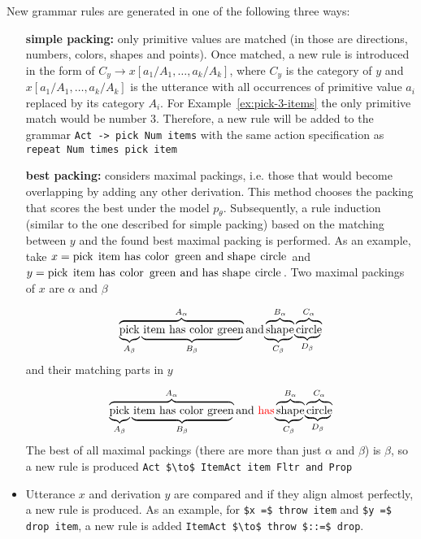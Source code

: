 New grammar rules are generated in one of the following three ways:
\begin{itemize}
 \item[\bf simple packing:] only primitive values are matched (in \tool those
 are directions, numbers, colors, shapes and points). Once matched, a new rule
 is introduced in the form of $C_y \rightarrow x[a_1/A_1,\ldots, a_k/A_k]$,
 where $C_y$ is the category of $y$ and $x[a_1/A_1,\ldots, a_k/A_k]$ is the
 utterance with all occurrences of primitive value $a_i$ replaced by its
 category $A_i$. For Example~\ref{ex:pick-3-items} the only primitive match would be number 3. Therefore, a new rule will be added to the grammar \lstinline{Act -> pick Num items} with the same action specification as \lstinline{repeat Num times pick item}

 \item[\bf best packing:] considers maximal packings, i.e. those that would
 become overlapping by adding any other derivation. This method chooses the
 packing that scores the best under the model $p_\theta$. Subsequently, a rule
 induction (similar to the one described for simple packing) based on the
 matching between $y$ and the found best maximal packing is performed.
 As an example, take $x = \text{\lstinline{pick item has color green and shape circle}}$ and
$y = \text{\lstinline{pick item has color green and has shape circle}}$. Two maximal packings of $x$ are $\alpha$ and $\beta$

 \[
 \ooalign{
 $\overbrace{\text{pick item has color green}}^{A_\alpha}\text{and}\overbrace{\text{shape}}^{B_\alpha}\overbrace{\text{circle}}^{C_\alpha}$\cr
 $\underbrace{\phantom{\text{pick}}}_{A_\beta}\underbrace{\phantom{\text{item has color green}}}_{B_\beta} \phantom{\text{and}} \underbrace{\phantom{\text{shape}}}_{C_\beta}\underbrace{\phantom{\text{circle}}}_{D_\beta}$\cr
 }
 \]
%
 and their matching parts in $y$

 \[
 \ooalign{
 $\overbrace{\text{pick item has color green}}^{A_\alpha}\text{and \textcolor{red}{has}}\overbrace{\text{shape}}^{B_\alpha}\overbrace{\text{circle}}^{C_\alpha}$\cr
 $\underbrace{\phantom{\text{pick}}}_{A_\beta}\underbrace{\phantom{\text{item has color green}}}_{B_\beta} \phantom{\text{and \textcolor{red}{has}}} \underbrace{\phantom{\text{shape}}}_{C_\beta}\underbrace{\phantom{\text{circle}}}_{D_\beta}$\cr
 }
 \]
%
The best of all maximal packings (there are more than just $\alpha$ and $\beta$) is $\beta$, so a new rule is produced
\lstinline{Act $\to$ ItemAct item Fltr and Prop}

 \item[\bf alignment:] Utterance $x$ and derivation $y$ are compared and if they align almost perfectly, a new rule is produced.
As an example, for \lstinline{$x =$ throw item} and \lstinline{$y =$ drop item}, a new rule is added
 \lstinline{ItemAct $\to$ throw $::=$ drop}.
\end{itemize}
